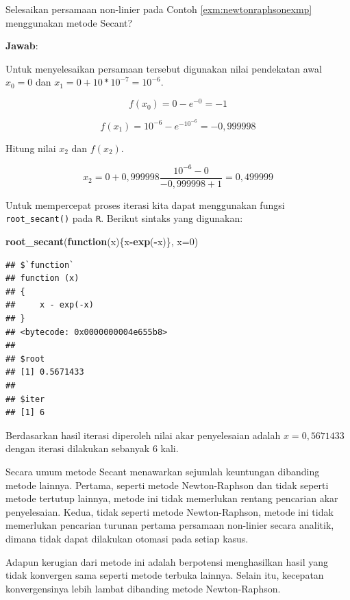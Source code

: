 \documentclass[]{book}
\newenvironment{Shaded}{\begin{snugshade}}{\end{snugshade}}
\newcommand{\ControlFlowTok}[1]{\textcolor[rgb]{0.13,0.29,0.53}{\textbf{#1}}}
\newcommand{\DataTypeTok}[1]{\textcolor[rgb]{0.13,0.29,0.53}{#1}}
\newcommand{\DecValTok}[1]{\textcolor[rgb]{0.00,0.00,0.81}{#1}}
\newcommand{\KeywordTok}[1]{\textcolor[rgb]{0.13,0.29,0.53}{\textbf{#1}}}
\newcommand{\NormalTok}[1]{#1}
\newcommand{\OperatorTok}[1]{\textcolor[rgb]{0.81,0.36,0.00}{\textbf{#1}}}
\theoremstyle{definition}
\theoremstyle{definition}
\theoremstyle{definition}
\theoremstyle{remark}
\let\BeginKnitrBlock\begin \let\EndKnitrBlock\end
\begin{document}
\BeginKnitrBlock{example}
\protect\hypertarget{exm:secantexmp}{}{\label{exm:secantexmp} }Selesaikan persamaan non-linier pada Contoh \ref{exm:newtonraphsonexmp} menggunakan metode Secant?
\EndKnitrBlock{example}

\textbf{Jawab}:

Untuk menyelesaikan persamaan tersebut digunakan nilai pendekatan awal \(x_0=0\) dan \(x_1=0+10*10^{-7}=10^{-6}\).

\[
f\left(x_0 \right)=0-e^{-0}=-1
\]

\[
f\left(x_1 \right)=10^{-6}-e^{-10^{-6}}=-0,999998
\]

Hitung nilai \(x_2\) dan \(f\left(x_2 \right)\).

\[
x_2=0+0,999998\frac{10^{-6}-0}{-0,999998+1}=0,499999
\]

Untuk mempercepat proses iterasi kita dapat menggunakan fungsi \texttt{root\_secant()} pada \texttt{R}. Berikut sintaks yang digunakan:

\begin{Shaded}
\begin{Highlighting}[]
\KeywordTok{root_secant}\NormalTok{(}\ControlFlowTok{function}\NormalTok{(x)\{x}\OperatorTok{-}\KeywordTok{exp}\NormalTok{(}\OperatorTok{-}\NormalTok{x)\}, }\DataTypeTok{x=}\DecValTok{0}\NormalTok{)}
\end{Highlighting}
\end{Shaded}

\begin{verbatim}
## $`function`
## function (x) 
## {
##     x - exp(-x)
## }
## <bytecode: 0x0000000004e655b8>
## 
## $root
## [1] 0.5671433
## 
## $iter
## [1] 6
\end{verbatim}

Berdasarkan hasil iterasi diperoleh nilai akar penyelesaian adalah \(x=0,5671433\) dengan iterasi dilakukan sebanyak \(6\) kali.

Secara umum metode Secant menawarkan sejumlah keuntungan dibanding metode lainnya. Pertama, seperti metode Newton-Raphson dan tidak seperti metode tertutup lainnya, metode ini tidak memerlukan rentang pencarian akar penyelesaian. Kedua, tidak seperti metode Newton-Raphson, metode ini tidak memerlukan pencarian turunan pertama persamaan non-linier secara analitik, dimana tidak dapat dilakukan otomasi pada setiap kasus.

Adapun kerugian dari metode ini adalah berpotensi menghasilkan hasil yang tidak konvergen sama seperti metode terbuka lainnya. Selain itu, kecepatan konvergensinya lebih lambat dibanding metode Newton-Raphson.
\end{document}
